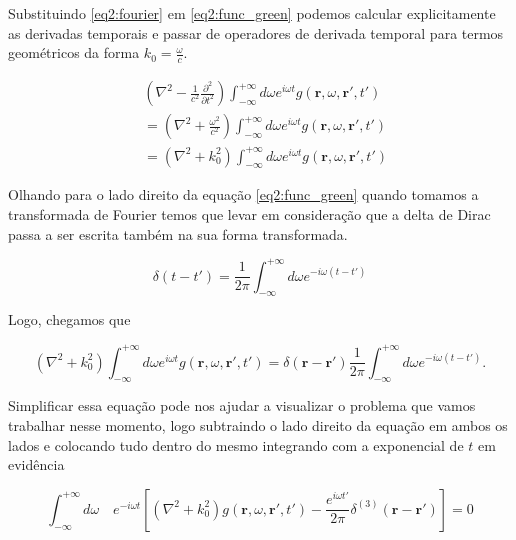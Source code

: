 Substituindo \ref{eq2:fourier} em \ref{eq2:func_green} podemos calcular explicitamente as derivadas temporais e passar de operadores de derivada temporal para termos geométricos da forma $k_0 = \frac{\omega}{c}$.

\begin{equation}
	\begin{split}
	& \left( \nabla^2-\frac{1}{c^2}\frac{\partial^2}{\partial t^2}\right) 
	\int_{-\infty}^{+\infty} d\omega e^{i\omega t} g(\textbf{r},\omega, \textbf{r}', t')\\
	& = \left( \nabla^2 + \frac{\omega^2}{c^2}\right)
	\int_{-\infty}^{+\infty} d\omega e^{i\omega t} g(\textbf{r},\omega, \textbf{r}', t')\\
	& = \left( \nabla^2 + k_0^2\right) \int_{-\infty}^{+\infty} d\omega e^{i\omega t} g(\textbf{r},\omega, \textbf{r}', t')
	\end{split}
\end{equation}

Olhando para o lado direito da equação \ref{eq2:func_green} quando tomamos a transformada de Fourier temos que levar em consideração que a delta de Dirac passa a ser escrita também na sua forma transformada.

\begin{equation}
	\delta(t-t') = \frac{1}{2\pi}\int_{-\infty}^{+\infty} d\omega e^{-i\omega (t-t')}
	\label{eq2:delta}
\end{equation}

Logo, chegamos que

\begin{equation}
	\left( \nabla^2 + k_0^2\right) \int_{-\infty}^{+\infty} d\omega e^{i\omega t} g(\textbf{r},\omega, \textbf{r}', t') = \delta(\textbf{r}-\textbf{r}')\frac{1}{2\pi}\int_{-\infty}^{+\infty} d\omega e^{-i\omega (t-t')}.
\end{equation}

Simplificar essa equação pode nos ajudar a visualizar o problema que vamos trabalhar nesse momento, logo subtraindo o lado direito da equação em ambos os lados e colocando tudo dentro do mesmo integrando com a exponencial de $t$ em evidência

\begin{equation}
	\int_{-\infty}^{+\infty} d\omega \quad 
	e^{-i\omega t}
	\left[ \left( \nabla^2 + k_0^2\right) g(\textbf{r},\omega, \textbf{r}', t') 
	- \frac{e^{i\omega t'}}{2\pi}
	\delta^{(3)}(\textbf{r}-\textbf{r}')\right] = 0 
\end{equation}

